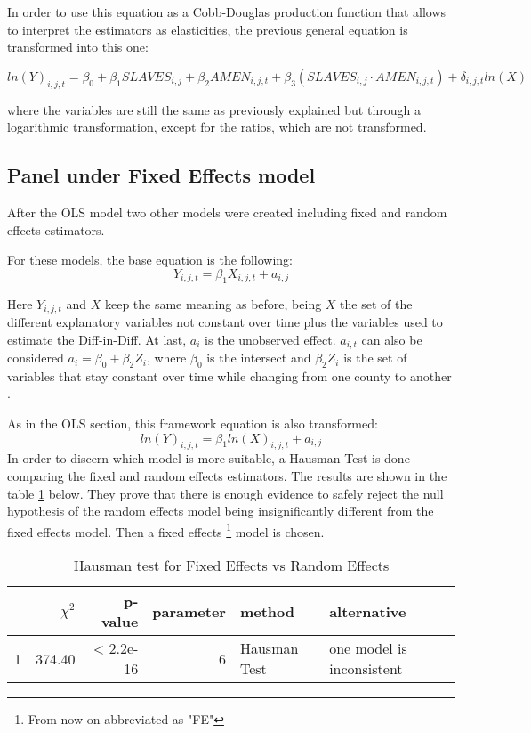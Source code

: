 \documentclass[12pt]{report}
\begin{document}
In order to use this equation as a Cobb-Douglas production function that allows to interpret the estimators as elasticities, the previous general equation is transformed into this one:

\begin{equation}
ln(Y)_{i,j,t}=\beta_{0}+\beta_{1}SLAVES_{i,j}+\beta_{2}AMEN_{i,j,t}+\beta_{3}(SLAVES_{i,j}\cdot AMEN_{i,j,t})+\delta_{i,j,t}ln(X)
\end{equation}

where the variables are still the same as previously explained but through a logarithmic transformation, except for the ratios, which are not transformed.
\subsection{Panel under Fixed Effects model}

After the OLS model two other models were created including fixed and random effects estimators.

For these models, the base equation is the following:
\begin{equation}
Y_{i,j,t}=\beta_{1}X_{i,j,t} + a_{i,j}
\end{equation}

Here $Y_{i,j,t}$ and $X$ keep the same meaning as before, being $X$ the set of the different explanatory variables not constant over time plus the variables used to estimate the Diff-in-Diff. At last, $a_{i}$ is the unobserved effect. $a_{i,t}$ can also be considered $a_{i}=\beta_{0}+\beta_{2}Z_{i}$, where $\beta_{0}$ is the intersect and $\beta_{2}Z_{i}$ is the set of variables that stay constant over time while changing from one county to another \citep[349]{stock2003introduction}.

As in the OLS section, this framework equation is also transformed:
\begin{equation}
ln(Y)_{i,j,t}=\beta_{1}ln(X)_{i,j,t} + a_{i,j}
\end{equation}
In order to discern which model is more suitable, a Hausman Test is done comparing the fixed and random effects estimators. The results are shown in the table \ref{tab:phtest} below. They prove that there is enough evidence to safely reject the null hypothesis of the random effects model being insignificantly different from the fixed effects model. Then a fixed effects \footnote{From now on abbreviated as "FE"} model is chosen.

\begin{table}[ht]
\centering
\caption{Hausman test for Fixed Effects vs Random Effects}
\label{tab:phtest}
\begin{tabular}{rrrrll}
  \hline
 & $\chi^{2}$ & p-value & parameter & method & alternative \\ 
  \hline
1 & 374.40 & < 2.2e-16 &   6 & Hausman Test & one model is inconsistent \\ 
   \hline
\end{tabular}
\end{table}
\end{document}
